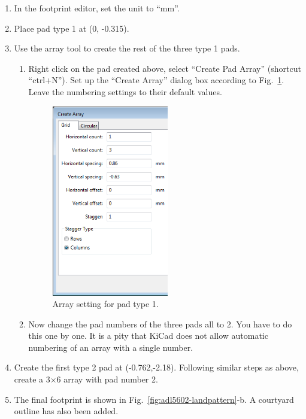 \documentclass[12pt,letterpaper]{scrartcl}
\begin{document}
\begin{enumerate}
	\item In the footprint editor, set the unit to ``mm''.
	\item Place pad type 1 at (0, -0.315). 
	\item Use the array tool to create the rest of the three type 1 pads. 	
		\begin{enumerate}
			\item Right click on the pad created above, select ``Create Pad Array'' (shortcut ``ctrl+N''). Set up the ``Create Array'' dialog box according to Fig.~\ref{fig:pad-array-1}. Leave the numbering settings to their default values.
			
			\begin{figure}[hp]
				\centering
				\includegraphics[width=2in]{pad-array-1}
				\caption{Array setting for pad type 1.}
				\label{fig:pad-array-1}
			\end{figure}
			
			\item Now change the pad numbers of the three pads all to 2. You have to do this one by one. It is a pity that KiCad does not allow automatic numbering of an array with a single number. 
			 
		\end{enumerate}
	\item Create the first type 2 pad at (-0.762,-2.18). Following similar steps as above, create a 3$\times$6 array with pad number 2.
	
	\item The final footprint is shown in Fig.~\ref{fig:adl5602-landpattern}-b. A courtyard outline has also been added. 

\end{enumerate}
\end{document}
